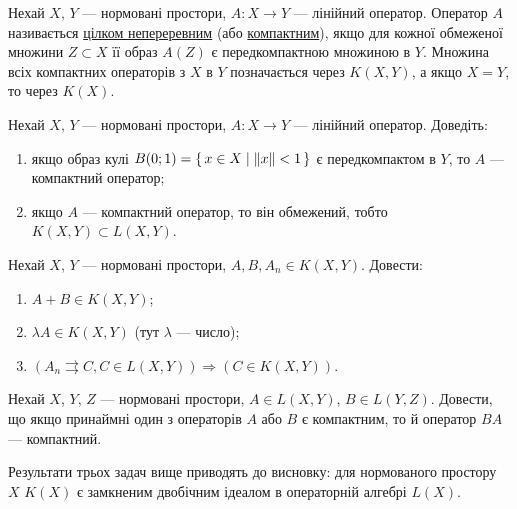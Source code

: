 
\begin{theory}
    Нехай $X$, $Y$ --- нормовані простори, $A: X \to Y$ --- лінійний оператор.
    Оператор $A$ називається \ul{цілком непереревним} (або \ul{компактним}),
    якщо для кожної обмеженої множини $Z \subset X$ її образ $A(Z)$ є передкомпактною
    множиною в $Y$. 
    Множина всіх компактних операторів з $X$ в $Y$ позначається через 
    \ul{$K(X,Y)$}, а якщо $X = Y$, то через \ul{$K(X)$}.
\end{theory}

\begin{exercise}
    Нехай $X$, $Y$ --- нормовані простори, $A: X \to Y$ --- лінійний оператор. Доведіть:
    \begin{enumerate}
        \item якщо образ кулі $B(0;1) = \set{x \in X \mid \left\lVert x\right\rVert < 1}$ є передкомпактом в $Y$, то $A$ --- компактний оператор;
        \item якщо $A$ --- компактний оператор, то він обмежений, тобто $K(X,Y) \subset L(X,Y)$.
    \end{enumerate}
\end{exercise}

\begin{exercise}
    Нехай $X$, $Y$ --- нормовані простори, $A, B, A_n \in K(X,Y)$. Довести:
    \begin{enumerate}
        \item $A+B \in K(X, Y)$;
        \item $\lambda A \in K(X, Y)$ (тут $\lambda$ --- число);
        \item $\left( A_n \rightrightarrows C, C\in L(X, Y)\right) \Rightarrow \left( C \in K(X, Y)\right)$.
    \end{enumerate}
\end{exercise}

\begin{exercise}
    Нехай $X$, $Y$, $Z$ --- нормовані простори, $A \in L(X, Y)$, $B \in L(Y, Z)$.
    Довести, що якщо принаймні один з операторів $A$ або $B$ є компактним, то й оператор $BA$ --- компактний.
\end{exercise}

\begin{theory}
    Результати трьох задач вище приводять до висновку: для нормованого простору $X$ $K(X)$ 
    є замкненим двобічним ідеалом в операторній алгебрі $L(X)$.
\end{theory}

